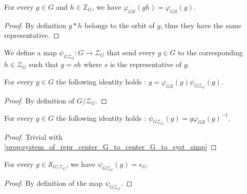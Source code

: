 \begin{proposition}
    \label{prop:G_to_syst_simp}
    \leanok
    For every $g\in G$ and $h\in\mathbb{Z}_G$, we have $\varphi_{G\mathcal{S}}(gh)=\varphi_{G\mathcal{S}} (g)$.
\end{proposition}
\begin{proof}
    \leanok
    By definition $g*h$ belongs to the orbit of $g$, thus they have the same representative.
\end{proof}

\begin{definition}
    \label{def:G_to_center}
    \leanok
    We define a map $\psi_{G\mathcal{Z}_G} : G \rightarrow \mathcal{Z}_G$ that
    send every $g\in G$ to the corresponding $h\in \mathcal{Z}_G$ such that 
    $g=sh$ where $s$ is the representative of $g$.
\end{definition}

\begin{proposition}
    \label{prop:system_of_repr_center_G_to_center_G_to_syst_simp}
    \leanok
     For every $g\in G$ the following identity holds : $g=\varphi_{G\mathcal{S}}(g) \psi_{G\mathcal{Z}_G}(g)$.
\end{proposition}
\begin{proof}
    \leanok
    By definition of $G/\mathcal{Z}_G$.
\end{proof}

\begin{proposition}
    \label{prop:system_of_repr_center_G_to_center_eq_G_G_to_syst_simp}
    \leanok
    For every $g\in G$ the following identity holds : $\psi_{G\mathcal{Z}_G}(g)=g\varphi_{G\mathcal{S}}(g)^{-1}$.
\end{proposition}
\begin{proof}
    \leanok
    Trivial with \ref{prop:system_of_repr_center_G_to_center_G_to_syst_simp}
\end{proof}

\begin{proposition}
    \label{prop:system_of_repr_center_G_to_center_syst_apply_simp}
    \leanok
    For every $g\in \mathcal{S}_{G/\mathcal{Z}_G}$, we have $\psi_{G\mathcal{Z}_G}(g)=e_G$.
\end{proposition}
\begin{proof}
    \leanok
    By definition of the map $\psi_{G\mathcal{Z}_G}$.
\end{proof}

